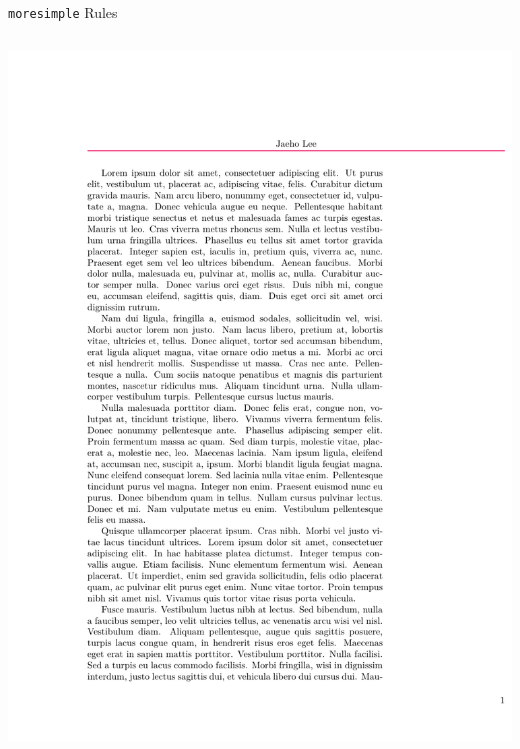 \documentclass{beamer}
\begin{document}
\begin{frame}[fragile]{\texttt{moresimple} Rules}
\begin{columns}
    \begin{column}{0.4\textwidth}
      \begin{overprint}
        \includegraphics[frame,width=\linewidth]{moresimple-rw-1}

\end{overprint}
\end{column}
\end{columns}
\end{frame}
\end{document}
